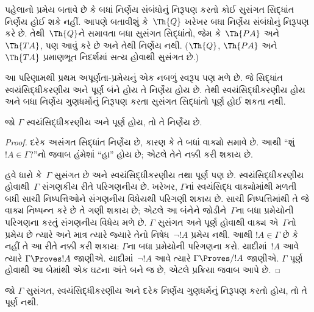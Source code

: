 \begin{explain}
પહેલાનો પ્રમેય બતાવે છે કે બધાં
નિર્ણેય સંબંધોનું નિરૂપણ
કરતો કોઈ સુસંગત સિદ્ધાંત નિર્ણેય
હોઈ શકે નહીં. આપણે બતાવીશું કે~$\Th{Q}$
ખરેખર બધા નિર્ણેય સંબંધોનું
નિરૂપણ કરે છે. તેથી~$\Th{Q}$ને
સમાવતા બધા સુસંગત સિદ્ધાંતો, જેમ કે~$\Th{PA}$
અને~$\Th{TA}$, પણ આવું કરે છે અને તેથી
નિર્ણેય નથી. ($\Th{Q}$, $\Th{PA}$ અને~$\Th{TA}$
પ્રમાણભૂત નિદર્શમાં સત્ય હોવાથી સુસંગત છે.)

આ પરિણામથી પ્રથમ અપૂર્ણતા-પ્રમેયનું એક
નબળું સ્વરૂપ પણ મળે છે. જે સિદ્ધાંત
સ્વયંસિદ્ધીકરણીય અને પૂર્ણ બંને
હોય તે નિર્ણેય હોય છે. તેથી
સ્વયંસિદ્ધીકરણીય હોય અને બધા
નિર્ણેય ગુણધર્મોનું નિરૂપણ
કરતા સુસંગત સિદ્ધાંતો પૂર્ણ
હોઈ શકતા નથી.
\end{explain}

\begin{thm}
જો $\Gamma$ સ્વયંસિદ્ધીકરણીય અને
પૂર્ણ હોય, તો તે નિર્ણેય છે.
\end{thm}

\begin{proof}
દરેક અસંગત સિદ્ધાંત નિર્ણેય છે,
કારણ કે તે બધાં વાક્યો સમાવે છે.
આથી ``શું $!A \in \Gamma$?''નો જવાબ
હંમેશાં ``હા'' હોય છે; એટલે તેને નક્કી
કરી શકાય છે.

હવે ધારો કે~$\Gamma$ સુસંગત છે અને
સ્વયંસિદ્ધીકરણીય તથા પૂર્ણ પણ છે.
સ્વયંસિદ્ધીકરણીય હોવાથી~$\Gamma$
સંગણકીય રીતે પરિગણનીય છે. ખરેખર,
$\Gamma$નાં સ્વયંસિદ્ધ વાક્યોમાંથી મળતી
બધી સાચી નિષ્પત્તિઓને સંગણનીય
વિધેયથી પરિગણી શકાય છે. સાચી
નિષ્પત્તિમાંથી તે જે વાક્ય
નિષ્પન્ન કરે છે તે ગણી શકાય છે;
એટલે આ બંનેને જોડીને~$\Gamma$ના બધા
પ્રમેયોની પરિગણના કરતું સંગણનીય વિધેય
મળે છે. $\Gamma$ સુસંગત અને પૂર્ણ
હોવાથી વાક્ય એ~$\Gamma$નો પ્રમેય છે ત્યારે અને
માત્ર ત્યારે જ્યારે તેનો નિષેધ~$\lnot !A$ પ્રમેય નથી.
આથી $!A \in \Gamma$ છે કે નહીં તે
આ રીતે નક્કી કરી શકાય: $\Gamma$ના
બધા પ્રમેયોની પરિગણના કરો. યાદીમાં~$!A$
આવે ત્યારે $\Gamma \Proves !A$ જાણીએ.
યાદીમાં~$\lnot !A$ આવે ત્યારે
$\Gamma \Proves/ !A$ જાણીએ. $\Gamma$
પૂર્ણ હોવાથી આ બેમાંથી એક ઘટના
અંતે બને જ છે, એટલે પ્રક્રિયા જવાબ આપે છે.
\end{proof}

\begin{cor}
જો $\Gamma$ સુસંગત, સ્વયંસિદ્ધીકરણીય
અને દરેક નિર્ણેય ગુણધર્મનું
નિરૂપણ કરતો હોય, તો તે
પૂર્ણ નથી.
\end{cor}

